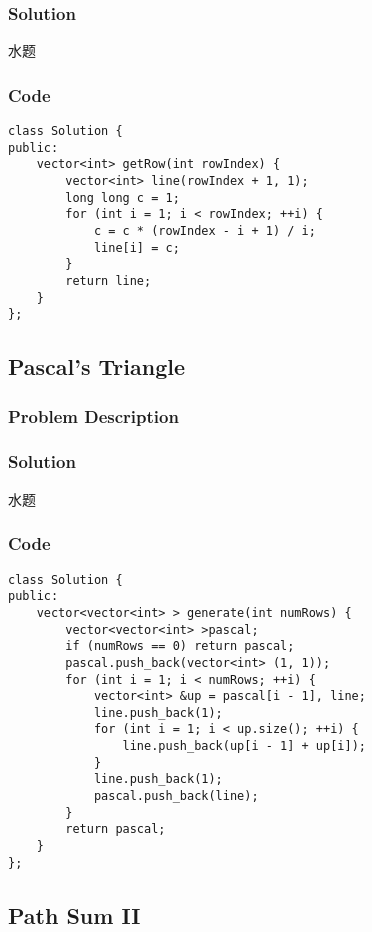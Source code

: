 \documentclass[courier]{article}
\begin{document}
\begin{CJK*}{UTF8}{gkai}
\subsubsection*{Solution}
水题

\subsubsection*{Code}
\begin{lstlisting}
class Solution {
public:
    vector<int> getRow(int rowIndex) {
        vector<int> line(rowIndex + 1, 1);
        long long c = 1;
        for (int i = 1; i < rowIndex; ++i) {
            c = c * (rowIndex - i + 1) / i;
            line[i] = c;
        }
        return line;
    }
}; 
\end{lstlisting}


\subsection{ Pascal's Triangle }

\subsubsection*{Problem Description}


\subsubsection*{Solution}
水题

\subsubsection*{Code}
\begin{lstlisting}
class Solution {
public:
    vector<vector<int> > generate(int numRows) {
        vector<vector<int> >pascal;
        if (numRows == 0) return pascal;
        pascal.push_back(vector<int> (1, 1));
        for (int i = 1; i < numRows; ++i) {
            vector<int> &up = pascal[i - 1], line;
            line.push_back(1);
            for (int i = 1; i < up.size(); ++i) {
                line.push_back(up[i - 1] + up[i]);
            }
            line.push_back(1);
            pascal.push_back(line);
        }
        return pascal;
    }
}; 
\end{lstlisting}


\subsection{ Path Sum II }


\end{CJK*}
\end{document}
